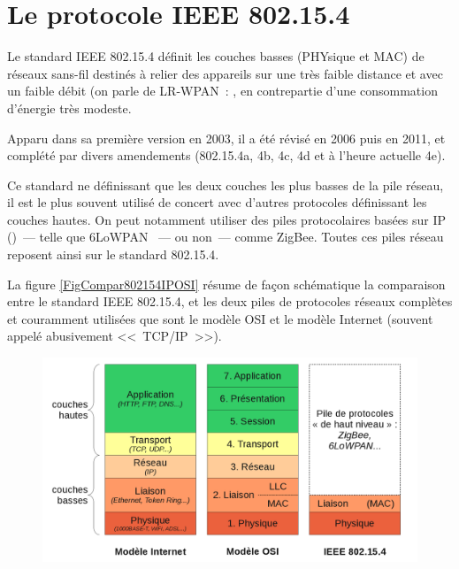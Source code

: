 
\section{Le protocole IEEE 802.15.4}
\label{SecProto802154}

Le standard IEEE 802.15.4 définit les couches basses (PHYsique et MAC)
de réseaux sans-fil destinés à relier des appareils sur une très faible
distance et avec un faible débit (on parle de LR-WPAN~: , en contrepartie d'une consommation
d'énergie très modeste.

Apparu dans sa première version en 2003, il a été révisé en 2006 puis en
2011, et complété par divers amendements (802.15.4a, 4b, 4c, 4d et 
à l'heure actuelle 4e).

Ce standard ne définissant que les deux couches les plus basses de la pile
réseau, il est le plus souvent utilisé de concert avec d'autres protocoles
définissant les couches hautes. On peut notamment utiliser des piles
protocolaires basées sur IP ()~--- telle que 6LoWPAN
\cite{6LoWPAN}~--- ou non~--- comme ZigBee.
Toutes ces piles réseau reposent ainsi sur le standard 802.15.4.

La figure \vref{FigCompar802154IPOSI} résume de façon schématique la
comparaison entre le standard IEEE 802.15.4, et les deux piles de protocoles
réseaux complètes et couramment utilisées que sont le modèle OSI et le
modèle Internet (souvent appelé abusivement <<~TCP/IP~>>).

\begin{figure}[!hbt]
\centering
\includegraphics[width=12.5cm]{images/ch3-ip-vs-osi-vs-802154.png}
\label{FigCompar802154IPOSI}
\end{figure}


